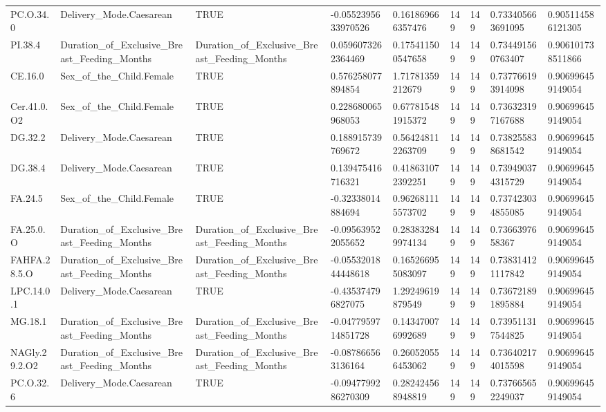 \begin{longtable}{lllllllll}
PC.O.34.0 & Delivery\_Mode.Caesarean & TRUE & -0.0552395633970526 & 0.161869666357476 & 149 & 149 & 0.733405663691095 & 0.905114586121305 \\
PI.38.4 & Duration\_of\_Exclusive\_Breast\_Feeding\_Months & Duration\_of\_Exclusive\_Breast\_Feeding\_Months & 0.0596073262364469 & 0.175411500547658 & 149 & 149 & 0.734491560763407 & 0.906101738511866 \\
CE.16.0 & Sex\_of\_the\_Child.Female & TRUE & 0.576258077894854 & 1.71781359212679 & 149 & 149 & 0.737766193914098 & 0.906996459149054 \\
Cer.41.0.O2 & Sex\_of\_the\_Child.Female & TRUE & 0.228680065968053 & 0.677815481915372 & 149 & 149 & 0.736323197167688 & 0.906996459149054 \\
DG.32.2 & Delivery\_Mode.Caesarean & TRUE & 0.188915739769672 & 0.564248112263709 & 149 & 149 & 0.738255838681542 & 0.906996459149054 \\
DG.38.4 & Delivery\_Mode.Caesarean & TRUE & 0.139475416716321 & 0.418631072392251 & 149 & 149 & 0.739490374315729 & 0.906996459149054 \\
FA.24.5 & Sex\_of\_the\_Child.Female & TRUE & -0.32338014884694 & 0.962681115573702 & 149 & 149 & 0.737423034855085 & 0.906996459149054 \\
FA.25.0.O & Duration\_of\_Exclusive\_Breast\_Feeding\_Months & Duration\_of\_Exclusive\_Breast\_Feeding\_Months & -0.095639522055652 & 0.283832849974134 & 149 & 149 & 0.7366397658367 & 0.906996459149054 \\
FAHFA.28.5.O & Duration\_of\_Exclusive\_Breast\_Feeding\_Months & Duration\_of\_Exclusive\_Breast\_Feeding\_Months & -0.0553201844448618 & 0.165266955083097 & 149 & 149 & 0.738314121117842 & 0.906996459149054 \\
LPC.14.0.1 & Delivery\_Mode.Caesarean & TRUE & -0.435374796827075 & 1.29249619879549 & 149 & 149 & 0.736721891895884 & 0.906996459149054 \\
MG.18.1 & Duration\_of\_Exclusive\_Breast\_Feeding\_Months & Duration\_of\_Exclusive\_Breast\_Feeding\_Months & -0.0477959714851728 & 0.143470076992689 & 149 & 149 & 0.739511317544825 & 0.906996459149054 \\
NAGly.29.2.O2 & Duration\_of\_Exclusive\_Breast\_Feeding\_Months & Duration\_of\_Exclusive\_Breast\_Feeding\_Months & -0.087866563136164 & 0.260520556453062 & 149 & 149 & 0.736402174015598 & 0.906996459149054 \\
PC.O.32.6 & Delivery\_Mode.Caesarean & TRUE & -0.0947799286270309 & 0.282424568948819 & 149 & 149 & 0.737665652249037 & 0.906996459149054 \\

\end{longtable}

